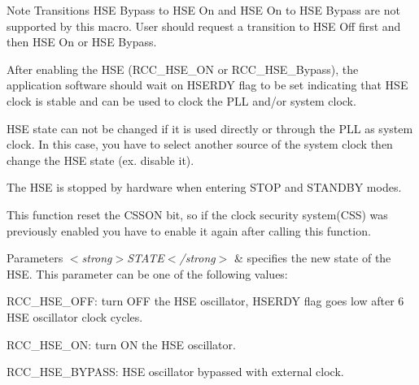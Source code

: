 \begin{DoxyNote}{Note}
Transitions H\+SE Bypass to H\+SE On and H\+SE On to H\+SE Bypass are not supported by this macro. User should request a transition to H\+SE Off first and then H\+SE On or H\+SE Bypass. 

After enabling the H\+SE (R\+C\+C\+\_\+\+H\+S\+E\+\_\+\+ON or R\+C\+C\+\_\+\+H\+S\+E\+\_\+\+Bypass), the application software should wait on H\+S\+E\+R\+DY flag to be set indicating that H\+SE clock is stable and can be used to clock the P\+LL and/or system clock. 

H\+SE state can not be changed if it is used directly or through the P\+LL as system clock. In this case, you have to select another source of the system clock then change the H\+SE state (ex. disable it). 

The H\+SE is stopped by hardware when entering S\+T\+OP and S\+T\+A\+N\+D\+BY modes. 

This function reset the C\+S\+S\+ON bit, so if the clock security system(\+C\+S\+S) was previously enabled you have to enable it again after calling this function. 
\end{DoxyNote}

\begin{DoxyParams}{Parameters}
{\em $<$strong$>$\+S\+T\+A\+T\+E$<$/strong$>$} & specifies the new state of the H\+SE. This parameter can be one of the following values\+: \begin{DoxyItemize}
\item R\+C\+C\+\_\+\+H\+S\+E\+\_\+\+O\+FF\+: turn O\+FF the H\+SE oscillator, H\+S\+E\+R\+DY flag goes low after 6 H\+SE oscillator clock cycles. \item R\+C\+C\+\_\+\+H\+S\+E\+\_\+\+ON\+: turn ON the H\+SE oscillator. \item R\+C\+C\+\_\+\+H\+S\+E\+\_\+\+B\+Y\+P\+A\+SS\+: H\+SE oscillator bypassed with external clock. \end{DoxyItemize}
\\
\hline
\end{DoxyParams}
